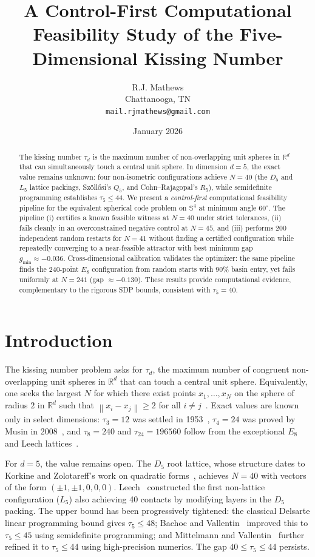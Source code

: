 \documentclass[11pt]{article}
\title{\textbf{A Control-First Computational Feasibility Study of the Five-Dimensional Kissing Number}}
\author{R.J. Mathews\\
\small Chattanooga, TN\\
\small \texttt{mail.rjmathews@gmail.com}}
\date{January 2026}
\newcommand{\R}{\mathbb{R}}
\newcommand{\Sn}[1]{\mathbb{S}^{#1}}
\newcommand{\norm}[1]{\left\lVert #1 \right\rVert}
\begin{document}
\maketitle

\begin{abstract}
The kissing number $\tau_d$ is the maximum number of non-overlapping unit spheres in $\R^d$ that can simultaneously touch a central unit sphere. In dimension $d=5$, the exact value remains unknown: four non-isometric configurations achieve $N=40$ (the $D_5$ and $L_5$ lattice packings, Sz\"{o}ll\H{o}si's $Q_5$, and Cohn--Rajagopal's $R_5$), while semidefinite programming establishes $\tau_5 \le 44$.
We present a \emph{control-first} computational feasibility pipeline for the equivalent spherical code problem on $\Sn{4}$ at minimum angle $60^\circ$. The pipeline (i) certifies a known feasible witness at $N=40$ under strict tolerances, (ii) fails cleanly in an overconstrained negative control at $N=45$, and (iii) performs 200 independent random restarts for $N=41$ without finding a certified configuration while repeatedly converging to a near-feasible attractor with best minimum gap $g_{\min}\approx -0.036$.
Cross-dimensional calibration validates the optimizer: the same pipeline finds the 240-point $E_8$ configuration from random starts with 90\% basin entry, yet fails uniformly at $N=241$ (gap $\approx -0.130$).
These results provide computational evidence, complementary to the rigorous SDP bounds, consistent with $\tau_5=40$.
\end{abstract}

\section{Introduction}
The kissing number problem asks for $\tau_d$, the maximum number of congruent non-overlapping unit spheres in $\R^d$ that can touch a central unit sphere.
Equivalently, one seeks the largest $N$ for which there exist points $x_1,\dots,x_N$ on the sphere of radius $2$ in $\R^d$ such that $\norm{x_i-x_j}\ge 2$ for all $i\neq j$~\cite{ConwaySloane}.
Exact values are known only in select dimensions: $\tau_3=12$ was settled in 1953~\cite{SchutteVdW}, $\tau_4=24$ was proved by Musin in 2008~\cite{Musin2008}, and $\tau_8=240$ and $\tau_{24}=196560$ follow from the exceptional $E_8$ and Leech lattices~\cite{Viazovska2017,CKMRV2017}.

For $d=5$, the value remains open. The $D_5$ root lattice, whose structure dates to Korkine and Zolotareff's work on quadratic forms~\cite{KorkineZolotareff1873}, achieves $N=40$ with vectors of the form $(\pm1,\pm1,0,0,0)$. Leech~\cite{Leech1967} constructed the first non-lattice configuration ($L_5$) also achieving 40 contacts by modifying layers in the $D_5$ packing. The upper bound has been progressively tightened: the classical Delsarte linear programming bound gives $\tau_5 \le 48$; Bachoc and Vallentin~\cite{BachocVallentin2008} improved this to $\tau_5 \le 45$ using semidefinite programming; and Mittelmann and Vallentin~\cite{MittelmannVallentin2010} further refined it to $\tau_5 \le 44$ using high-precision numerics. The gap $40 \le \tau_5 \le 44$ persists.
\end{document}

